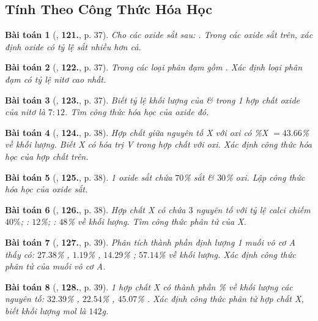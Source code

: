 \documentclass{article}
\numberwithin{equation}{section}
\newtheorem{baitoan}{Bài toán}[section]
\begin{document}
\subsection{Tính Theo Công Thức Hóa Học}

\begin{baitoan}[\cite{An2011}, \textbf{121.}, p. 37]
	Cho các oxide sắt sau: . Trong các oxide sắt trên, xác định oxide có tỷ lệ sắt nhiều hơn cả.
\end{baitoan}

\begin{baitoan}[\cite{An2011}, \textbf{122.}, p. 37]
	Trong các loại phân đạm gồm . Xác định loại phân đạm có tỷ lệ nitơ cao nhất.
\end{baitoan}

\begin{baitoan}[\cite{An2011}, \textbf{123.}, p. 37]
	Biết tỷ lệ khối lượng của  \&  trong 1 hợp chất oxide của nitơ là $7:12$. Tìm công thức hóa học của oxide đó.
\end{baitoan}

\begin{baitoan}[\cite{An2011}, \textbf{124.}, p. 38]
	Hợp chất giữa nguyên tố X với oxi có \%X $= 43.66$\% về khối lượng. Biết X có hóa trị V trong hợp chất với oxi. Xác định công thức hóa học của hợp chất trên.
\end{baitoan}

\begin{baitoan}[\cite{An2011}, \textbf{125.}, p. 38]
	1 oxide sắt chứa $70$\% sắt \& $30$\% oxi. Lập công thức hóa học của oxide sắt.
\end{baitoan}

\begin{baitoan}[\cite{An2011}, \textbf{126.}, p. 38]
	Hợp chất X có chứa $3$ nguyên tố  với tỷ lệ calci chiếm $40\%$; : $12$\%; : $48$\% về khối lượng. Tìm công thức phân tử của X.
\end{baitoan}

\begin{baitoan}[\cite{An2011}, \textbf{127.}, p. 39]
	Phân tích thành phần định lượng 1 muối vô cơ A thấy có: $27.38$\% , $1.19$\% , $14.29$\% ; $57.14$\%  về khối lượng. Xác định công thức phân tử của muối vô cơ A.
\end{baitoan}

\begin{baitoan}[\cite{An2011}, \textbf{128.}, p. 39]
	1 hợp chất X có thành phần \% về khối lượng các nguyên tố: $32.39$\% , $22.54$\% , $45.07$\% . Xác định công thức phân tử hợp chất X, biết khối lượng mol là $142$g.
\end{baitoan}
\end{document}

